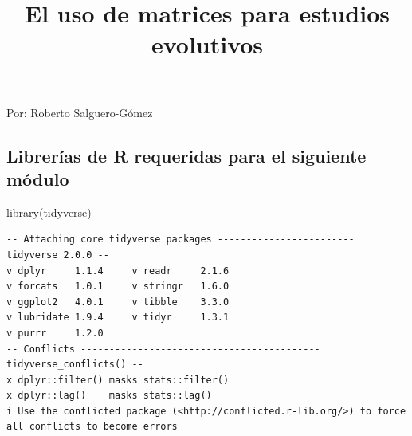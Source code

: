 \documentclass[
  12pt,
  letterpaper,
]{book}
\title{El uso de matrices para estudios evolutivos}
\author{}
\date{}
\newenvironment{Shaded}{\begin{snugshade}}{\end{snugshade}}
\newcommand{\FunctionTok}[1]{\textcolor[rgb]{0.28,0.35,0.67}{#1}}
\newcommand{\NormalTok}[1]{\textcolor[rgb]{0.00,0.23,0.31}{#1}}
\renewcommand*\contentsname{Table of contents}
\newcommand\contentsname{Table of contents}
\begin{document}
\frontmatter
\maketitle

\renewcommand*\contentsname{Table of contents}
{
\hypersetup{linkcolor=}
\setcounter{tocdepth}{2}
\tableofcontents
}

\mainmatter
Por: Roberto Salguero-Gómez

\subsection{Librerías de R requeridas para el siguiente
módulo}\label{libreruxedas-de-r-requeridas-para-el-siguiente-muxf3dulo}

\begin{Shaded}
\begin{Highlighting}[]
\FunctionTok{library}\NormalTok{(tidyverse)}
\end{Highlighting}
\end{Shaded}

\begin{verbatim}
-- Attaching core tidyverse packages ------------------------ tidyverse 2.0.0 --
v dplyr     1.1.4     v readr     2.1.6
v forcats   1.0.1     v stringr   1.6.0
v ggplot2   4.0.1     v tibble    3.3.0
v lubridate 1.9.4     v tidyr     1.3.1
v purrr     1.2.0     
-- Conflicts ------------------------------------------ tidyverse_conflicts() --
x dplyr::filter() masks stats::filter()
x dplyr::lag()    masks stats::lag()
i Use the conflicted package (<http://conflicted.r-lib.org/>) to force all conflicts to become errors
\end{verbatim}


\backmatter
\end{document}
